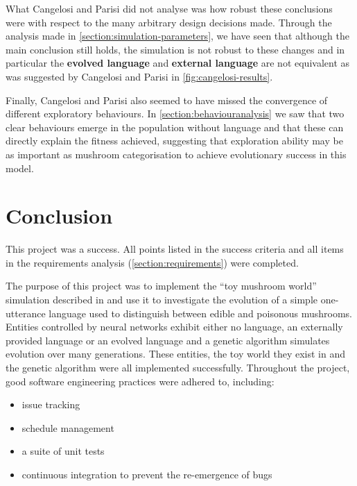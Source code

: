 \documentclass[12pt,a4paper]{report}
\begin{document}
What Cangelosi and Parisi did not analyse was how robust these conclusions were with respect to the many arbitrary design decisions made. Through the analysis made in \cref{section:simulation-parameters}, we have seen that although the main conclusion still holds, the simulation is not robust to these changes and in particular the {\bf evolved language} and {\bf external language} are not equivalent as was suggested by Cangelosi and Parisi in \cref{fig:cangelosi-results}.

Finally, Cangelosi and Parisi also seemed to have missed the convergence of different exploratory behaviours. In \cref{section:behaviouranalysis} we saw that two clear behaviours emerge in the population without language and that these can directly explain the fitness achieved, suggesting that exploration ability may be as important as mushroom categorisation to achieve evolutionary success in this model.


\chapter{Conclusion}

This project was a success. All points listed in the success criteria and all items in the requirements analysis (\cref{section:requirements}) were completed.

The purpose of this project was to implement the ``toy mushroom world'' simulation described in \citet{Cangelosi1998} and use it to investigate the evolution of a simple one-utterance language used to distinguish between edible and poisonous mushrooms. Entities controlled by neural networks exhibit either no language, an externally provided language or an evolved language and a genetic algorithm simulates evolution over many generations. These entities, the toy world they exist in and the genetic algorithm were all implemented successfully. Throughout the project, good software engineering practices were adhered to, including:
\begin{itemize}
    \item issue tracking
    \item schedule management
    \item a suite of unit tests
    \item continuous integration to prevent the re-emergence of bugs
\end{itemize}
\end{document}
